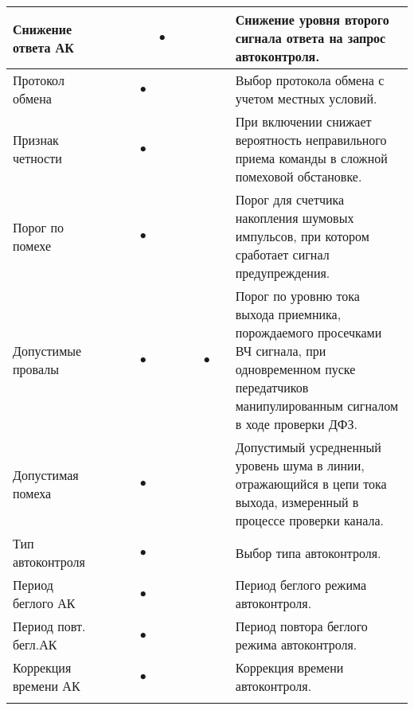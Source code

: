 \begin{tabularx}{\linewidth}{| M{4.6cm} |*{9}{p{0.3cm} |} m{5.8cm} |}
	Снижение ответа АК	&   &   &   &   & $\bullet$ &   &   &   &   & Снижение уровня второго сигнала ответа на запрос автоконтроля. \tabularnewline \hline
	Протокол обмена		&   &   &   & $\bullet$ &   &   &   &   &   & Выбор протокола обмена с учетом местных условий. \tabularnewline \hline
	Признак четности	&   &   &   & $\bullet$ &   &   &   &   &   & При включении снижает вероятность неправильного приема команды в сложной помеховой обстановке. \tabularnewline \hline
	Порог по помехе		&   &   &   & $\bullet$ &   &   &   &   &   & Порог для счетчика накопления шумовых импульсов, при котором сработает сигнал предупреждения. \tabularnewline \hline
	Допустимые провалы	&   &   &   & $\bullet$ &   &   &   & $\bullet$ &   & Порог по уровню тока выхода приемника, порождаемого просечками ВЧ сигнала, при одновременном пуске передатчиков манипулированным сигналом в ходе проверки ДФЗ. \tabularnewline \hline
	Допустимая помеха	&   &   &   & $\bullet$ &   &   &   &   &   & Допустимый усредненный уровень шума в линии, отражающийся в цепи тока выхода, измеренный в процессе проверки канала. \tabularnewline \hline
	Тип автоконтроля	&   &   &   & $\bullet$ &   &   &   &   &   & Выбор типа автоконтроля. \tabularnewline \hline
	Период беглого АК	&   &   &   & $\bullet$ &   &   &   &   &   & Период беглого режима автоконтроля. \tabularnewline \hline
	Период повт. бегл.АК &   &   &   & $\bullet$ &   &   &   &   &   & Период повтора беглого режима автоконтроля. \tabularnewline \hline
	Коррекция времени АК &   &   &   & $\bullet$ &   &   &   &   &   & Коррекция времени автоконтроля. \tabularnewline 
	
    \lasthline
\end{tabularx} 